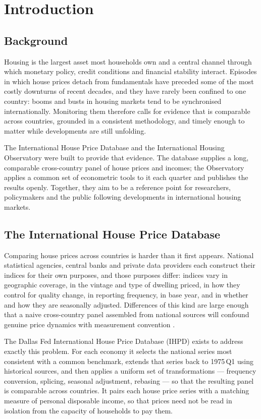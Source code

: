 \section{Introduction}
\label{sec:introduction}

\subsection{Background}

Housing is the largest asset most households own and a central channel
through which monetary policy, credit conditions and financial stability
interact. Episodes in which house prices detach from fundamentals have
preceded some of the most costly downturns of recent decades, and they have
rarely been confined to one country: booms and busts in housing markets tend
to be synchronised internationally. Monitoring them therefore calls for
evidence that is comparable across countries, grounded in a consistent
methodology, and timely enough to matter while developments are still
unfolding.

The International House Price Database and the International Housing
Observatory were built to provide that evidence. The database supplies a
long, comparable cross-country panel of house prices and incomes; the
Observatory applies a common set of econometric tools to it each quarter and
publishes the results openly. Together, they aim to be a reference point for
researchers, policymakers and the public following developments in
international housing markets.

\subsection{The International House Price Database}

Comparing house prices across countries is harder than it first appears.
National statistical agencies, central banks and private data providers each
construct their indices for their own purposes, and those purposes differ:
indices vary in geographic coverage, in the vintage and type of dwelling
priced, in how they control for quality change, in reporting frequency, in
base year, and in whether and how they are seasonally adjusted. Differences
of this kind are large enough that a naive cross-country panel assembled
from national sources will confound genuine price dynamics with measurement
convention \citep{mack2011}.

The Dallas Fed International House Price Database (IHPD) exists to address
exactly this problem. For each economy it selects the national series most
consistent with a common benchmark, extends that series back to 1975\,Q1
using historical sources, and then applies a uniform set of transformations
--- frequency conversion, splicing, seasonal adjustment, rebasing --- so that
the resulting panel is comparable across countries. It pairs each house price
series with a matching measure of personal disposable income, so that prices
need not be read in isolation from the capacity of households to pay them.

